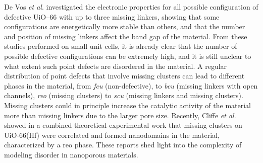 De Vos \textit{et al}.\cite{devos2017missing} investigated the electronic properties for all possible configuration of defective UiO--66 with up to three missing linkers, showing that some configurations are energetically more stable than others, and that the number and position of missing linkers affect the band gap of the material. From these studies performed on small unit cells, it is already clear that the number of possible defective configurations can be extremely high, and it is still unclear to what extent such point defects are disordered in the material. A regular distribution of point defects that involve missing clusters can lead to different phases in the material, from \textit{fcu} (non-defective), to \textit{bcu} (missing linkers with open channels), \textit{reo} (missing clusters) to \textit{scu} (missing linkers and missing clusters). Missing clusters could in principle increase the catalytic activity of the material more than missing linkers due to the larger pore size. Recently, Cliffe \textit{et al}. \cite{cliffe2014correlated} showed in a combined theoretical-experimental work that missing clusters on UiO-66(Hf) were correlated and formed nanodomains in the material, characterized by a reo phase. These reports shed light into the complexity of modeling disorder in nanoporous materials. 

